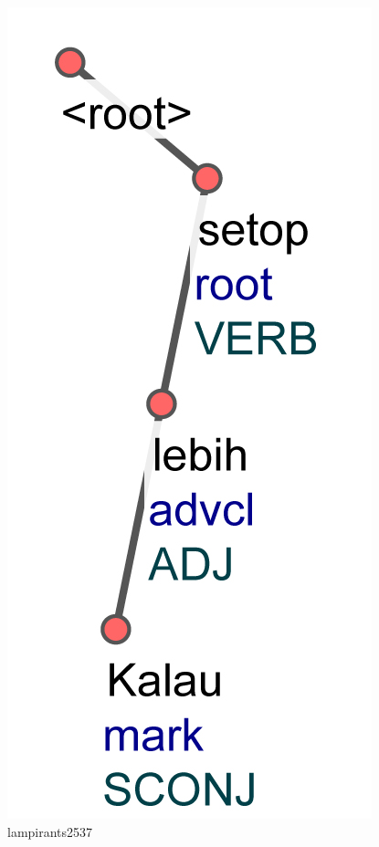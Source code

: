 \begin{figure}
	\centering \includegraphics[width=0.8
	\textwidth] {pics/lampiran/lampirants2537.jpg} 
	\caption{lampirants2537} 
	\label{fig:lampirants2537} 
\end{figure}

